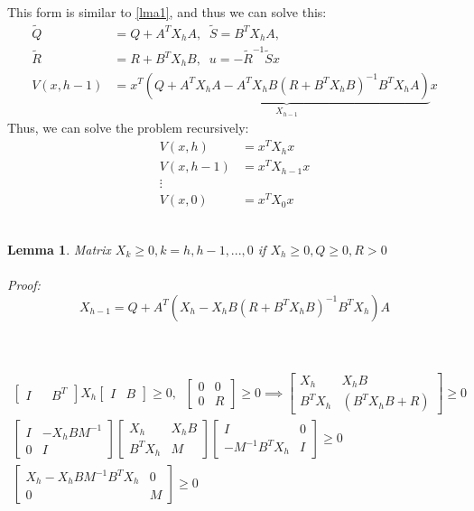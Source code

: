 \documentclass{article}
\newtheorem{lemma}[theorem]{Lemma}
\begin{document}
This form is similar to \eqref{lma1}, and thus we can solve this:
\[
\begin{aligned}
\tilde{Q} &= Q + A^T X_h A, \; \; \tilde{S} = B^T X_h A, \\ \tilde{R} &= R + B^TX_h B,  \; \; u = -\tilde{R}^{-1} \tilde{S} x
\\ 
V(x,h-1) &= x^T \underbrace{(Q + A^T X_h A - A^T X_h B (R + B^T X_h B)^{-1} B^T X_h A)}_{X_{h-1}} x 
\end{aligned}
\]
Thus, we can solve the problem recursively:
\[
\begin{aligned}
    V(x,h) &= x^T X_h x \\
    V(x,h-1) &= x^T X_{h-1}x \\
    \vdots \\ 
    V(x,0) &= x^TX_0 x
\end{aligned}
\]
\\
\begin{lemma}{ \normalfont Matrix $X_k \geq 0,k=h,h-1,...,0$ \normalfont if $X_h \geq 0, Q \geq 0, R > 0$}\label{lma2}
\\  \\ 
Proof:
\[
X_{h-1} = Q + A^T(X_h - X_hB(R + B^T X_h B)^{-1} B^T X_h)A
\]
\\ \\

\begin{gather*}
\begin{bmatrix}
I && B^T
\end{bmatrix}
X_h
\begin{bmatrix}
    I & B
\end{bmatrix}
\geq 0, \; \; 
\begin{bmatrix}
    0 & 0 \\ 0 & R
\end{bmatrix}
\geq 0 \implies \begin{bmatrix}
    X_h & X_h B \\ B^T X_h & (B^TX_h B + R)
\end{bmatrix} 
\geq 0
\\
\begin{bmatrix}
    I & -X_hBM^{-1} \\ 0 & I
\end{bmatrix}
\begin{bmatrix}
    X_h & X_hB \\ B^TX_h & M 
\end{bmatrix}
\begin{bmatrix}
    I & 0 \\ -M^{-1}B^TX_h & I 
\end{bmatrix}
\geq 0 
\\ 
\begin{bmatrix}
    X_h - X_h BM^{-1}B^TX_h & 0 \\ 0 & M
\end{bmatrix}
\geq 0
\end{gather*}
\end{lemma}
\end{document}
